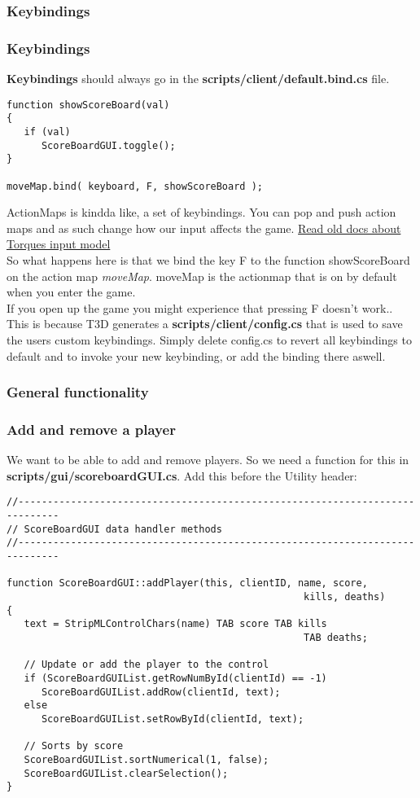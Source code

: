 \subsubsection{Keybindings}
\begin{frame}[fragile]
\frametitle{Keybindings}
{\bf Keybindings} should always go in the {\bf scripts/client/default.bind.cs} file.
\TS
\begin{lstlisting}
function showScoreBoard(val)
{
   if (val)
      ScoreBoardGUI.toggle();
}

moveMap.bind( keyboard, F, showScoreBoard );
\end{lstlisting}
ActionMaps is kindda like, a set of keybindings. You can pop and push action maps and as such change how our input affects the game.  {\color{blue} \href{http://docs.garagegames.com/tge/official/content/documentation/Engine/Reference/InputModel.html}{Read old docs about Torques input model}}\\
So what happens here is that we bind the key F to the function showScoreBoard on the action map {\it moveMap}. moveMap is the actionmap that is on
by default when you enter the game.\\
If you open up the game you might experience that pressing F doesn't work.. This is because T3D generates a {\bf scripts/client/config.cs} that is used to save the users custom
keybindings. Simply delete config.cs to revert all keybindings to default and to invoke your new keybinding, or add the binding there aswell.
\end{frame}
\subsubsection*{General functionality}
\begin{frame}[fragile]
\frametitle{Add and remove a player}
We want to be able to add and remove players. So we need a function for this in {\bf scripts/gui/scoreboardGUI.cs}. Add this before the Utility header:
\TS
\begin{lstlisting}
//-----------------------------------------------------------------------------
// ScoreBoardGUI data handler methods
//-----------------------------------------------------------------------------

function ScoreBoardGUI::addPlayer(this, clientID, name, score, 
                                                   kills, deaths)
{
   text = StripMLControlChars(name) TAB score TAB kills 
                                                   TAB deaths;

   // Update or add the player to the control
   if (ScoreBoardGUIList.getRowNumById(clientId) == -1)
      ScoreBoardGUIList.addRow(clientId, text);
   else
      ScoreBoardGUIList.setRowById(clientId, text);

   // Sorts by score
   ScoreBoardGUIList.sortNumerical(1, false);
   ScoreBoardGUIList.clearSelection();
}
\end{lstlisting}
\end{frame}

